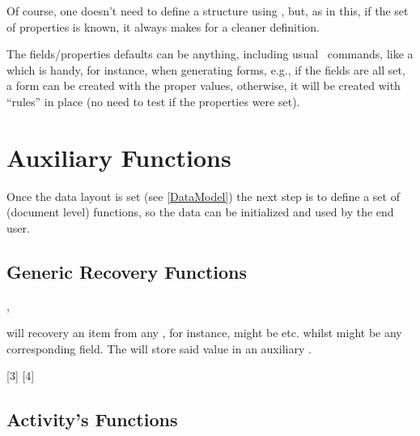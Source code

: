 \documentclass[10pt]{article}
\begin{document}
Of course, one doesn't need to define a  structure using , but, as in this,  if the set of properties is known, it always makes for a cleaner definition.

\begin{tsremark}
  The fields/properties defaults can be anything, including usual \LaTeXe\  commands, like a \tsobj{\rule} which is handy, for instance, when generating forms, e.g., if the fields are all set, a form can be created with the proper values, otherwise, it will be  created with ``rules'' in place (no need to test if the properties were set).
\end{tsremark}









\section{Auxiliary Functions}
Once the data layout is set (see \ref{DataModel}) the next step is to define a set of (document level) functions, so the data can be initialized and used by the end user.

\subsection{Generic Recovery Functions}\label{generic:datafield}

\begin{codedescribe}{\DataField,\DataGet}
  \begin{codesyntax}
  \end{codesyntax}
\tsobj{\DataField} will recovery an item from any , for instance,  might be  etc. whilst  might be any corresponding field. The \tsobj{\DataGet} will store said value in an auxiliary .
\end{codedescribe}


[3]
[4]

\subsection{Activity's Functions}
\end{document}
